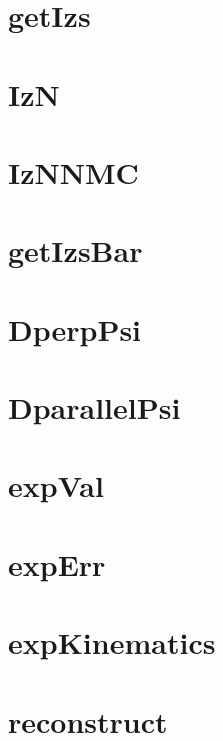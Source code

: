 \documentclass{book}
\begin{document}
\section{getIzs}

\section{IzN}

\section{IzNNMC}

\section{getIzsBar}

\section{DperpPsi}

\section{DparallelPsi}

\section{expVal}

\section{expErr}

\section{expKinematics}

\section{reconstruct}
\end{document}
